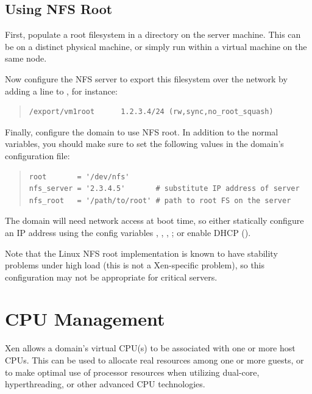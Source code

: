 \documentclass[11pt,twoside,final,openright]{report}
\begin{document}
\section{Using NFS Root}

First, populate a root filesystem in a directory on the server
machine. This can be on a distinct physical machine, or simply run
within a virtual machine on the same node.

Now configure the NFS server to export this filesystem over the
network by adding a line to , for instance:

\begin{quote}
  \begin{small}
\begin{verbatim}
/export/vm1root      1.2.3.4/24 (rw,sync,no_root_squash)
\end{verbatim}
  \end{small}
\end{quote}

Finally, configure the domain to use NFS root.  In addition to the
normal variables, you should make sure to set the following values in
the domain's configuration file:

\begin{quote}
  \begin{small}
\begin{verbatim}
root       = '/dev/nfs'
nfs_server = '2.3.4.5'       # substitute IP address of server
nfs_root   = '/path/to/root' # path to root FS on the server
\end{verbatim}
  \end{small}
\end{quote}

The domain will need network access at boot time, so either statically
configure an IP address using the config variables ,
, , ; or enable DHCP
().

Note that the Linux NFS root implementation is known to have stability
problems under high load (this is not a Xen-specific problem), so this
configuration may not be appropriate for critical servers.


\chapter{CPU Management}


Xen allows a domain's virtual CPU(s) to be associated with one or more
host CPUs.  This can be used to allocate real resources among one or
more guests, or to make optimal use of processor resources when
utilizing dual-core, hyperthreading, or other advanced CPU technologies.
\end{document}
